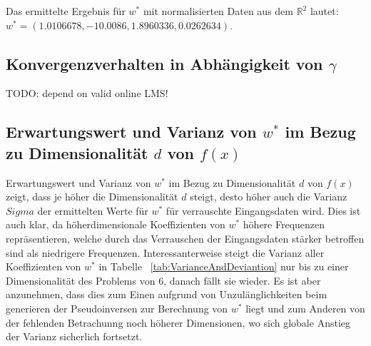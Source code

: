\documentclass[]{report}
\begin{document}
Das ermittelte Ergebnis f\"ur $w^*$ mit normalisierten Daten aus dem $\mathbb{R}^2$ lautet: $w^*=(1.0106678, - 10.0086, 1.8960336, 0.0262634)$.

\subsection{Konvergenzverhalten in Abh\"angigkeit von $\gamma$}

TODO: depend on valid online LMS!

\subsection{Erwartungswert und Varianz von $w^*$ im Bezug zu Dimensionalität $d$ von $f(x)$}

Erwartungswert und Varianz von $w^*$ im Bezug zu Dimensionalität $d$ von $f(x)$ zeigt, dass je h\"oher die Dimensionalität $d$ steigt, desto h\"oher auch die Varianz $Sigma$ der ermittelten Werte f\"ur $w^*$ f\"ur verrauschte Eingangsdaten wird. Dies ist auch klar, da höherdimensionale Koeffizienten von $w^*$ h\"ohere Frequenzen repr\"asentieren, welche durch das Verrauschen der Eingangsdaten st\"arker betroffen sind als niedrigere Frequenzen.
Interessanterweise steigt die Varianz aller Koeffizienten von $w^*$ in Tabelle ~\ref{tab:VarianceAndDeviantion} nur bis zu einer Dimensionalit\"at des Problems von 6, danach f\"allt sie wieder. Es ist aber anzunehmen, dass dies zum Einen aufgrund von Unzul\"anglichkeiten beim generieren der Pseudoinversen zur Berechnung von $w^*$ liegt und zum Anderen von der fehlenden Betrachunng noch h\"oherer Dimensionen, wo sich globale Anstieg der Varianz sicherlich fortsetzt.
\end{document}
